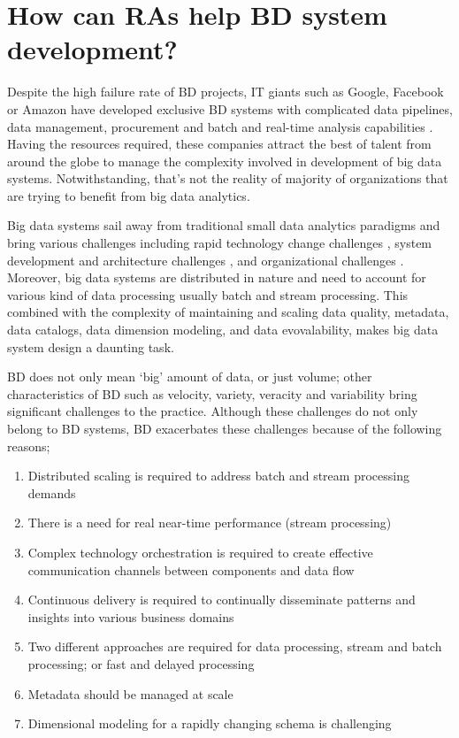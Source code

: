\documentclass[review]{elsarticle}
\begin{document}
\section{How can RAs help BD system development? }

Despite the high failure rate of BD projects, IT giants such as Google, Facebook or Amazon have developed exclusive BD systems with complicated data pipelines, data management, procurement and batch and real-time analysis capabilities \cite{kohler2019towards}. Having the resources required, these companies attract the best of talent from around the globe to manage the complexity involved in development of big data systems. Notwithstanding, that’s not the reality of majority of organizations that are trying to benefit from big data analytics. 

Big data systems sail away from traditional small data analytics paradigms and bring various challenges including rapid technology change challenges \cite{chen2017big}, system development and architecture challenges \cite{jagadish2014big}, and organizational challenges \cite{AtaeiHype}. Moreover, big data systems are distributed in nature and need to account for various kind of data processing usually batch and stream processing. This combined with the complexity of maintaining and scaling data quality, metadata, data catalogs, data dimension modeling, and data evovalability, makes big data system design a daunting task. 

BD does not only mean ‘big’ amount of data, or just volume; other characteristics of BD such as velocity, variety, veracity and variability bring significant challenges to the practice. Although these challenges do not only belong to BD systems, BD exacerbates these challenges because of the following reasons;

\begin{enumerate}
    \item Distributed scaling is required to address batch and stream processing demands
    \item There is a need for real near-time performance (stream processing) 
    \item Complex technology orchestration is required to create effective communication channels between components and data flow
    \item Continuous delivery is required to continually disseminate patterns and insights into various business domains
    \item Two different approaches are required for data processing, stream and batch processing; or fast and delayed processing 
    \item Metadata should be managed at scale 
    \item Dimensional modeling for a rapidly changing schema is challenging 
\end{enumerate}
\end{document}
